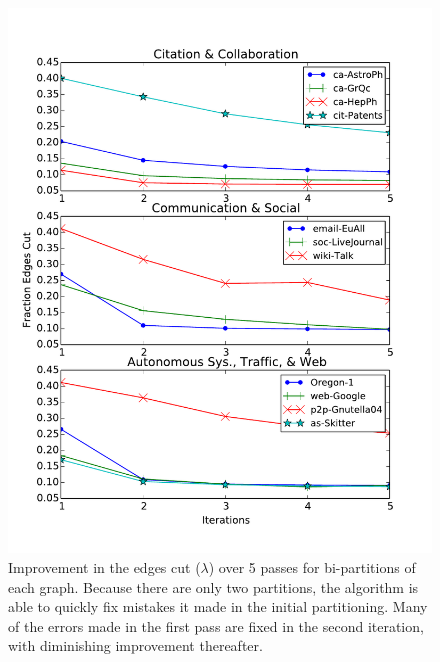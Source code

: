 \begin{figure}[h!]
\centering
\includegraphics[width=0.9\columnwidth] {figures/real_k2_lambda}
\caption[Caption for]{Improvement in the edges cut ($\lambda$) over 5 passes for bi-partitions of each graph. Because there are only two partitions, the algorithm is able to quickly fix mistakes it made in the initial partitioning. Many of the errors made in the first pass are fixed in the second iteration, with diminishing improvement thereafter.}
\label{fig:01}
\end{figure}

